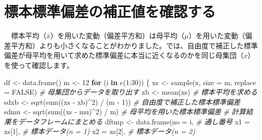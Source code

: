 \documentclass[]{tufte-handout}
\newenvironment{Shaded}{}{}
\newcommand{\AttributeTok}[1]{\textcolor[rgb]{0.49,0.56,0.16}{#1}}
\newcommand{\CommentTok}[1]{\textcolor[rgb]{0.38,0.63,0.69}{\textit{#1}}}
\newcommand{\ConstantTok}[1]{\textcolor[rgb]{0.53,0.00,0.00}{#1}}
\newcommand{\ControlFlowTok}[1]{\textcolor[rgb]{0.00,0.44,0.13}{\textbf{#1}}}
\newcommand{\DecValTok}[1]{\textcolor[rgb]{0.25,0.63,0.44}{#1}}
\newcommand{\FunctionTok}[1]{\textcolor[rgb]{0.02,0.16,0.49}{#1}}
\newcommand{\NormalTok}[1]{#1}
\newcommand{\OtherTok}[1]{\textcolor[rgb]{0.00,0.44,0.13}{#1}}
\newcommand{\SpecialCharTok}[1]{\textcolor[rgb]{0.25,0.44,0.63}{#1}}
\begin{document}
\newpage

\hypertarget{ux6a19ux672cux6a19ux6e96ux504fux5deeux306eux88dcux6b63ux5024ux3092ux78baux8a8dux3059ux308b}{%
\section{\texorpdfstring{\textbf{標本標準偏差の補正値を確認する}}{標本標準偏差の補正値を確認する}}\label{ux6a19ux672cux6a19ux6e96ux504fux5deeux306eux88dcux6b63ux5024ux3092ux78baux8a8dux3059ux308b}}

　標本平均（\(\bar{x}\)）を用いた変動（偏差平方和）は母平均（\(\mu\)）を用いた変動（偏差平方和）よりも小さくなることがわかりました。では、自由度で補正した標準偏差が母平均を用いて求めた標準偏差に本当に近くなるのかを同じ母集団（\(x\)）を使って確認します。

\begin{Shaded}
\begin{Highlighting}[numbers=left,,]
\NormalTok{df }\OtherTok{\textless{}{-}} \FunctionTok{data.frame}\NormalTok{()}
\NormalTok{m }\OtherTok{\textless{}{-}} \DecValTok{12}
\ControlFlowTok{for}\NormalTok{ (i }\ControlFlowTok{in} \FunctionTok{c}\NormalTok{(}\DecValTok{1}\SpecialCharTok{:}\DecValTok{30}\NormalTok{)) \{}
\NormalTok{  xs }\OtherTok{\textless{}{-}} \FunctionTok{sample}\NormalTok{(x, }\AttributeTok{size =}\NormalTok{ m, }\AttributeTok{replace =} \ConstantTok{FALSE}\NormalTok{)  }\CommentTok{\# 母集団からデータを取り出す}
\NormalTok{  xb }\OtherTok{\textless{}{-}} \FunctionTok{mean}\NormalTok{(xs)                              }\CommentTok{\# 標本平均を求める}
\NormalTok{  sdxb }\OtherTok{\textless{}{-}} \FunctionTok{sqrt}\NormalTok{(}\FunctionTok{sum}\NormalTok{((xs }\SpecialCharTok{{-}}\NormalTok{ xb)}\SpecialCharTok{\^{}}\DecValTok{2}\NormalTok{) }\SpecialCharTok{/}\NormalTok{ (m }\SpecialCharTok{{-}} \DecValTok{1}\NormalTok{))    }\CommentTok{\# 自由度で補正した標本標準偏差}
\NormalTok{  sdmu }\OtherTok{\textless{}{-}} \FunctionTok{sqrt}\NormalTok{(}\FunctionTok{sum}\NormalTok{((xs }\SpecialCharTok{{-}}\NormalTok{ mu)}\SpecialCharTok{\^{}}\DecValTok{2}\NormalTok{) }\SpecialCharTok{/}\NormalTok{ m)          }\CommentTok{\# 母平均を用いた標本標準偏差}
  \CommentTok{\# 計算結果をデータフレームにまとめる}
\NormalTok{  dftmp }\OtherTok{\textless{}{-}} \FunctionTok{data.frame}\NormalTok{(}\AttributeTok{no =}\NormalTok{ i,             }\CommentTok{\# 通し番号}
                      \AttributeTok{x1 =}\NormalTok{ xs[}\DecValTok{1}\NormalTok{],         }\CommentTok{\# 標本データ(n = 1)}
                      \AttributeTok{x2 =}\NormalTok{ xs[}\DecValTok{2}\NormalTok{],         }\CommentTok{\# 標本データ(n = 2)}

\end{Highlighting}
\end{Shaded}
\end{document}
